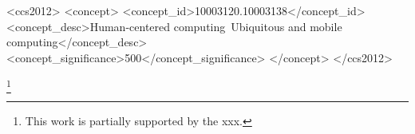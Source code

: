 \documentclass[acmlarge]{acmart}
\begin{document}
\begin{CCSXML}
	<ccs2012>
	<concept>
	<concept_id>10003120.10003138</concept_id>
	<concept_desc>Human-centered computing~Ubiquitous and mobile computing</concept_desc>
	<concept_significance>500</concept_significance>
	</concept>
	</ccs2012>
\end{CCSXML}



\thanks{This work is partially supported by the xxx.}

\maketitle

\renewcommand{\shortauthors}{L. Chang et al. }












\end{document}
